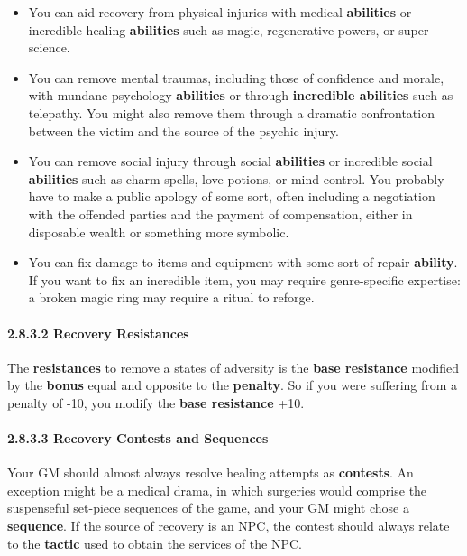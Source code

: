 \documentclass[
  11pt,
]{article}
\providecommand{\tightlist}{%
  \setlength{\itemsep}{0pt}\setlength{\parskip}{0pt}}
\begin{document}
\begin{itemize}
\tightlist
\item
  You can aid recovery from physical injuries with medical
  \textbf{abilities} or incredible healing \textbf{abilities} such as
  magic, regenerative powers, or super-science.
\item
  You can remove mental traumas, including those of confidence and
  morale, with mundane psychology \textbf{abilities} or through
  \textbf{incredible abilities} such as telepathy. You might also remove
  them through a dramatic confrontation between the victim and the
  source of the psychic injury.
\item
  You can remove social injury through social \textbf{abilities} or
  incredible social \textbf{abilities} such as charm spells, love
  potions, or mind control. You probably have to make a public apology
  of some sort, often including a negotiation with the offended parties
  and the payment of compensation, either in disposable wealth or
  something more symbolic.
\item
  You can fix damage to items and equipment with some sort of repair
  \textbf{ability}. If you want to fix an incredible item, you may
  require genre-specific expertise: a broken magic ring may require a
  ritual to reforge.
\end{itemize}

\hypertarget{recovery-resistances}{%
\paragraph{2.8.3.2 Recovery Resistances}\label{recovery-resistances}}

The \textbf{resistances} to remove a states of adversity is the
\textbf{base resistance} modified by the \textbf{bonus} equal and
opposite to the \textbf{penalty}. So if you were suffering from a
penalty of -10, you modify the \textbf{base resistance} +10.

\hypertarget{recovery-contests-and-sequences}{%
\paragraph{2.8.3.3 Recovery Contests and
Sequences}\label{recovery-contests-and-sequences}}

Your GM should almost always resolve healing attempts as
\textbf{contests}. An exception might be a medical drama, in which
surgeries would comprise the suspenseful set-piece sequences of the
game, and your GM might chose a \textbf{sequence}. If the source of
recovery is an NPC, the contest should always relate to the
\textbf{tactic} used to obtain the services of the NPC.
\end{document}
